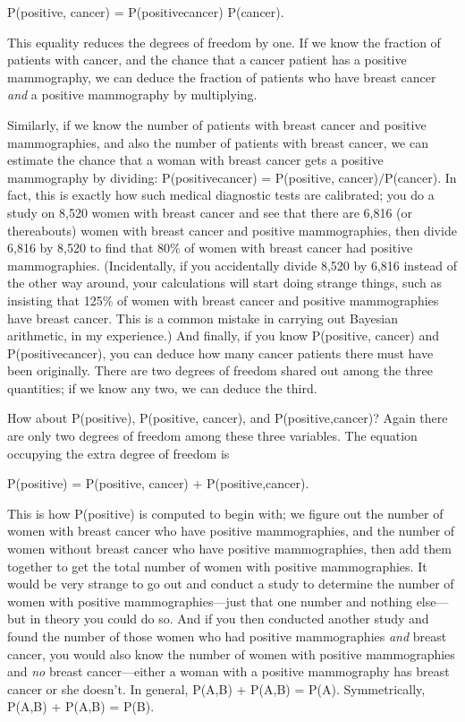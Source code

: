 {\centering
 P(positive, cancer) = P(positive{\textbar}cancer) {\texttimes}
P(cancer).
\par}


\bigskip

{
 This equality reduces the degrees of freedom by one. If we know
the fraction of patients with cancer, and the chance that a cancer
patient has a positive mammography, we can deduce the fraction of
patients who have breast cancer \textit{and} a positive mammography by
multiplying.}

{
 Similarly, if we know the number of patients with breast cancer
and positive mammographies, and also the number of patients with breast
cancer, we can estimate the chance that a woman with breast cancer gets
a positive mammography by dividing: P(positive{\textbar}cancer) =
P(positive, cancer)$/$P(cancer). In fact, this is exactly how such
medical diagnostic tests are calibrated; you do a study on 8,520 women
with breast cancer and see that there are 6,816 (or thereabouts) women
with breast cancer and positive mammographies, then divide 6,816 by
8,520 to find that 80\% of women with breast cancer had positive
mammographies. (Incidentally, if you accidentally divide 8,520 by 6,816
instead of the other way around, your calculations will start doing
strange things, such as insisting that 125\% of women with breast
cancer and positive mammographies have breast cancer. This is a common
mistake in carrying out Bayesian arithmetic, in my experience.) And
finally, if you know P(positive, cancer) and
P(positive{\textbar}cancer), you can deduce how many cancer patients
there must have been originally. There are two degrees of freedom
shared out among the three quantities; if we know any two, we can
deduce the third.}

{
 How about P(positive), P(positive, cancer), and
P(positive,{\textlnot}cancer)? Again there are only two degrees of
freedom among these three variables. The equation occupying the extra
degree of freedom is}

{\centering
 P(positive) = P(positive, cancer) + P(positive,{\textlnot}cancer).
\par}


\bigskip

{
 This is how P(positive) is computed to begin with; we figure out
the number of women with breast cancer who have positive mammographies,
and the number of women without breast cancer who have positive
mammographies, then add them together to get the total number of women
with positive mammographies. It would be very strange to go out and
conduct a study to determine the number of women with positive
mammographies---just that one number and nothing else---but in theory
you could do so. And if you then conducted another study and found the
number of those women who had positive mammographies \textit{and}
breast cancer, you would also know the number of women with positive
mammographies and \textit{no} breast cancer---either a woman with a
positive mammography has breast cancer or she doesn't.
In general, P(A,B) + P(A,{\textlnot}B) = P(A). Symmetrically, P(A,B) +
P({\textlnot}A,B) = P(B).}


